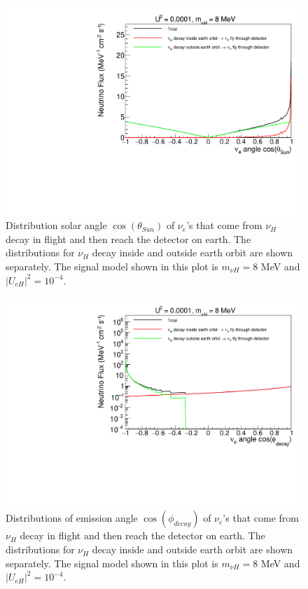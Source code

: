 \documentclass[%
 reprint,
 amsmath,amssymb,
 aps,
 prd,
floatfix,
twocolumn,
]{revtex4-1}
\begin{document}
\begin{figure}[!htbp]
\includegraphics[width=0.99\columnwidth]{../plots/DecayInFlightNuLCosthetaSun_U0.0001_M8.0_InsideOutside_linXlinY.pdf}
\caption{Distribution solar angle $\cos(\theta_{Sun})$ of $\nu_e$'s that come from $\nu_H$ decay in flight and then reach the detector on earth. The distributions for $\nu_H$ decay inside and outside earth orbit are shown separately. The signal model shown in this plot is $m_{\nu H} = 8$ MeV and $|U_{eH}|^2 = 10^{-4}$.}
\label{fig:DecayInFlightTheta_U0.0001_M8} 
\end{figure}


\begin{figure}[!htbp]
\includegraphics[width=0.99\columnwidth]{../plots/DecayInFlightNuLCosphiSun_U0.0001_M8.0_InsideOutside_linXlogY.pdf}
\caption{Distributions of emission angle $\cos(\phi_{decay})$ of $\nu_e$'s that come from $\nu_H$ decay in flight and then reach the detector on earth. The distributions for $\nu_H$ decay inside and outside earth orbit are shown separately. The signal model shown in this plot is $m_{\nu H} = 8$ MeV and $|U_{eH}|^2 = 10^{-4}$.}
\label{fig:DecayInFlightPhi_U0.0001_M8} 
\end{figure}
\end{document}
